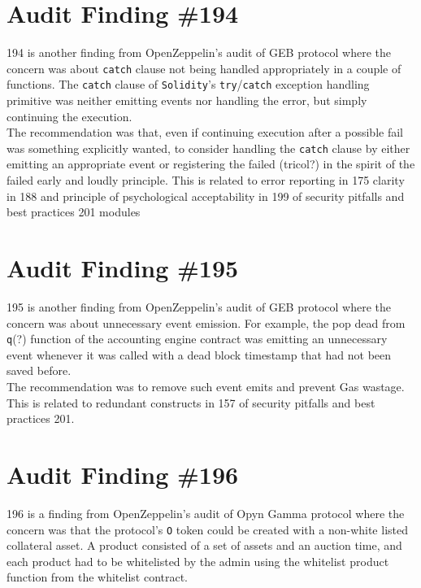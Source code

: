 \section{Audit Finding \#194}

194 is another finding from OpenZeppelin's audit of GEB protocol where the concern was about \verb|catch| clause not being handled appropriately in a couple of functions. The \verb|catch| clause of \verb|Solidity|'s \verb|try|/\verb|catch| exception handling primitive was neither emitting events nor handling the error, but simply continuing the execution.\\

The recommendation was that, even if continuing execution after a possible fail was something explicitly wanted, to consider handling the \verb|catch| clause by either emitting an appropriate event or registering the failed (tricol?) in the spirit of the failed early and loudly principle. This is related to error reporting in 175 clarity in 188 and principle of psychological acceptability in 199 of security pitfalls and best practices 201 modules

\section{Audit Finding \#195}

195 is another finding from OpenZeppelin's audit of GEB protocol where the concern was about unnecessary event emission. For example, the pop dead from \verb|q|(?) function of the accounting engine contract was emitting an unnecessary event whenever it was called with a dead block timestamp that had not been saved before.\\

The recommendation was to remove such event emits and prevent Gas wastage. This is related to redundant constructs in 157 of security pitfalls and best practices 201.

\section{Audit Finding \#196}

196 is a finding from OpenZeppelin's audit of Opyn Gamma protocol where the concern was that the protocol's \verb|O| token could be created with a non-white listed collateral asset. A product consisted of a set of assets and an auction time, and each product had to be whitelisted by the admin using the whitelist product function from the whitelist contract.\\

